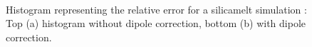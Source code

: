 \documentclass[11pt,twoside,a4paper]{report}
\begin{document}
\begin{figure}[H]
  \label{fig:histogram}
    \centering  
 \\    
  
    \caption{Histogram representing the relative error for a silicamelt simulation : Top (a) histogram without dipole correction, bottom (b) with dipole correction.}    
   \end{figure}   
\end{document}
